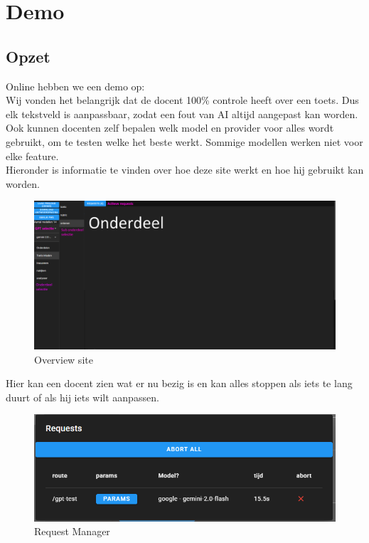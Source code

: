 \documentclass[12pt]{article}
\begin{document}
\section{Demo}
\subsection{Opzet}
Online hebben we een demo op: \href{https://toetspws.web.app/}\\
Wij vonden het belangrijk dat de docent 100\% controle heeft over een toets. Dus elk tekstveld is aanpassbaar, zodat een fout van AI altijd aangepast kan worden. \\
Ook kunnen docenten zelf bepalen welk model en provider voor alles wordt gebruikt, om te testen welke het beste werkt. Sommige modellen werken niet voor elke feature.
\\
Hieronder is informatie te vinden over hoe deze site werkt en hoe hij gebruikt kan worden.\\
\begin{figure}[H]
    \centering
    \includegraphics[width=\linewidth]{./images/demo/overview.png}
    \caption{Overview site}
    \label{fig:demo-overview}
\end{figure}

\noindent Hier kan een docent zien wat er nu bezig is en kan alles stoppen als iets te lang duurt of als hij iets wilt aanpassen.
\begin{figure}[H]
    \centering
    \includegraphics[width=\linewidth]{./images/demo/requests.png}
    \caption{Request Manager}
    \label{fig:request-manager}
\end{figure}
\end{document}
